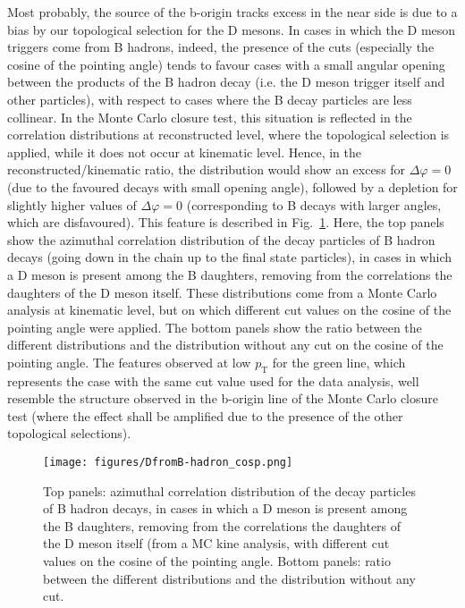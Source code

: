 Most probably, the source of the b-origin tracks excess in the near side is due to a bias by our topological selection for the D mesons. In cases in which the D meson triggers come from B hadrons, indeed, the presence of the cuts (especially the cosine of the pointing angle) tends to favour cases with a small angular opening between the products of the B hadron decay (i.e. the D meson trigger itself and other particles), with respect to cases where the B decay particles are less collinear.
In the Monte Carlo closure test, this situation is reflected in the correlation distributions at reconstructed level, where the topological selection is applied, while it does not occur at kinematic level. Hence, in the reconstructed/kinematic ratio, the distribution would show an excess for $\Delta\varphi = 0$ (due to the favoured decays with small opening angle), followed by a depletion for slightly higher values of $\Delta\varphi = 0$ (corresponding to B decays with larger angles, which are disfavoured).
This feature is described in Fig.~\ref{fig:MC_Bdecay_Angle}. Here, the top panels show the azimuthal correlation distribution of the decay particles of B hadron decays (going down in the chain up to the final state particles), in cases in which a D meson is present among the B daughters, removing from the correlations the daughters of the D meson itself. These distributions come from a Monte Carlo analysis at kinematic level, but on which different cut values on the cosine of the pointing angle were applied.
The bottom panels show the ratio between the different distributions and the distribution without any cut on the cosine of the pointing angle. The features observed at low $p_\text{T}$ for the green line, which represents the case with the same cut value used for the data analysis, well resemble the structure observed in the b-origin line of the Monte Carlo closure test (where the effect shall be amplified due to the presence of the other topological selections).

\begin{figure}
\centering
{\texttt{[image: figures/DfromB-hadron\_cosp.png]}}
\caption{Top panels: azimuthal correlation distribution of the decay particles of B hadron decays, in cases in which a D meson is present among the B daughters, removing from the correlations the daughters of the D meson itself (from a MC kine analysis, with different cut values on the cosine of the pointing angle. Bottom panels: ratio between the different distributions and the distribution without any cut.} \label{fig:MC_Bdecay_Angle}
\end{figure} 